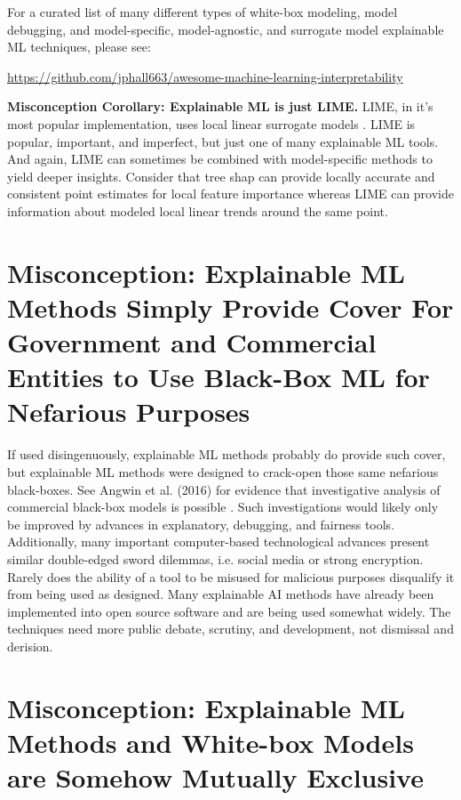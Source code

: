 \documentclass{article}
\begin{document}
For a curated list of many different types of white-box modeling, model debugging, and model-specific, model-agnostic, and surrogate model explainable ML techniques, please see:
\begin{center}
\url{https://github.com/jphall663/awesome-machine-learning-interpretability}
\end{center}

\textbf{Misconception Corollary: Explainable ML is just LIME.} LIME, in it's most popular implementation, uses local linear surrogate models \cite{lime}. LIME is popular, important, and imperfect, but just one of many explainable ML tools. And again, LIME can sometimes be combined with model-specific methods to yield deeper insights. Consider that tree shap can provide locally accurate and consistent point estimates for local feature importance whereas LIME can provide information about modeled local linear trends around the same point.   

\section{Misconception: Explainable ML Methods Simply Provide Cover For Government and Commercial Entities to Use Black-Box ML for Nefarious Purposes}

If used disingenuously, explainable ML methods probably do provide such cover, but explainable ML methods were designed to crack-open those same nefarious black-boxes. See Angwin et al. (2016) for evidence that investigative analysis of commercial black-box models is possible \cite{angwin16}. Such investigations would likely only be improved by advances in explanatory, debugging, and fairness tools. \\

Additionally, many important computer-based technological advances present similar double-edged sword dilemmas, i.e. social media or strong encryption. Rarely does the ability of a tool to be misused for malicious purposes  disqualify it from being used as designed. Many explainable AI methods have already been implemented into open source software and are being used somewhat widely. The techniques need more public debate, scrutiny, and development, not dismissal and derision.

\section{Misconception: Explainable ML Methods and White-box Models are Somehow Mutually Exclusive}
\end{document}
